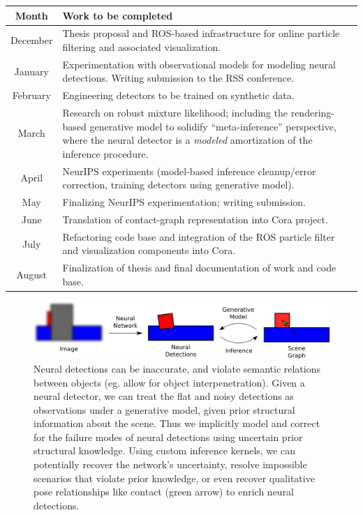   \begin{table}[h]
    \begin{tabularx}{\textwidth}{|c|X|}
      \hline
      \textbf{Month} & \textbf{Work to be completed} \\
      \hline
      December & Thesis proposal and ROS-based infrastructure for online particle filtering and associated visualization. \\
      \hline
      January  & Experimentation with observational models for modeling neural detections. Writing submission to the RSS conference. \\
      \hline
      February & Engineering detectors to be trained on synthetic data. \\
      \hline
      March    & Research on robust mixture likelihood; including the rendering-based generative model to solidify ``meta-inference'' perspective, where the neural detector is a \textit{modeled} amortization of the inference procedure. \\
      \hline
      April    & NeurIPS experiments (model-based inference cleanup/error correction, training detectors using generative model). \\
      \hline
      May      & Finalizing NeurIPS experimentation; writing submission. \\
      \hline
      June     & Translation of contact-graph representation into Cora project. \\
      \hline
      July     & Refactoring code base and integration of the ROS particle filter and visualization components into Cora. \\
      \hline
      August   & Finalization of thesis and final documentation of work and code base. \\
      \hline
    \end{tabularx}
  \end{table}

  \begin{figure}
    \centering
    \includegraphics[width=\textwidth]{figures/neural-model.png}
    \caption{\small
      Neural detections can be inaccurate, and violate semantic relations
      between objects (eg. allow for object interpenetration). Given a neural
      detector, we can treat the flat and noisy detections as observations
      under a generative model, given prior structural information about the
      scene. Thus we implicitly model and correct for the failure modes of
      neural detections using uncertain prior structural knowledge. Using
      custom inference kernels, we can potentially recover the network's
      uncertainty, resolve impossible scenarios that violate prior knowledge,
      or even recover qualitative pose relationships like contact (green arrow)
      to enrich neural detections.
    }
    \label{fig:neural-model}
  \end{figure}
  

